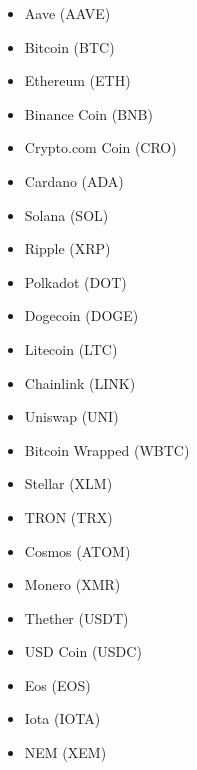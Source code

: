 \documentclass[zavrsnirad]{fer}
\begin{document}
\begin{itemize}
    \item Aave (AAVE)
    \item Bitcoin (BTC)
    \item Ethereum (ETH)
    \item Binance Coin (BNB)
    \item Crypto.com Coin (CRO)
    \item Cardano (ADA)
    \item Solana (SOL)
    \item Ripple (XRP)
    \item Polkadot (DOT)
    \item Dogecoin (DOGE)
    \item Litecoin (LTC)
    \item Chainlink (LINK)
    \item Uniswap (UNI)
    \item Bitcoin Wrapped (WBTC)
    \item Stellar (XLM)
    \item TRON (TRX)
    \item Cosmos (ATOM)
    \item Monero (XMR)
    \item Thether (USDT)
    \item USD Coin (USDC)
    \item Eos (EOS)
    \item Iota (IOTA)
    \item NEM (XEM)
\end{itemize}


\end{document}
